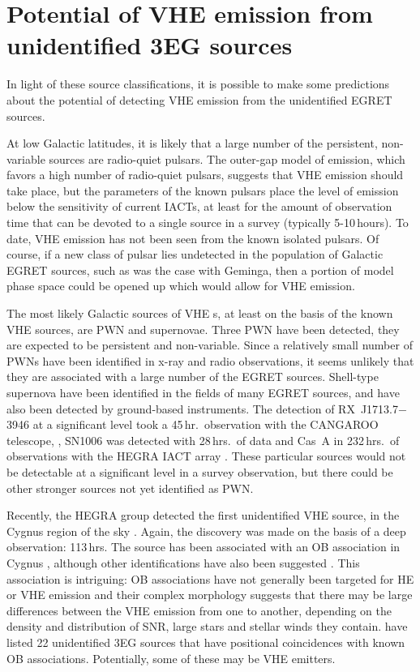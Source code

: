 \section{Potential of VHE emission from unidentified 3EG sources}
\label{SEC::SOURCES::VHE3EG}

In light of these source classifications, it is possible to make some
predictions about the potential of detecting VHE emission from the
unidentified EGRET sources.

At low Galactic latitudes, it is likely that a large number of the
persistent, non-variable sources are radio-quiet pulsars. The
outer-gap model of emission, which favors a high number of radio-quiet
pulsars, suggests that VHE \Gray emission should take place, but the
parameters of the known pulsars place the level of emission below the
sensitivity of current IACTs, at least for the amount of observation
time that can be devoted to a single source in a survey (typically
5-10\,hours). To date, VHE emission has not been seen from the known
isolated pulsars. Of course, if a new class of pulsar lies undetected
in the population of Galactic EGRET sources, such as was the case with
Geminga, then a portion of model phase space could be opened up which
would allow for VHE emission.

The most likely Galactic sources of VHE {\Grayc}s, at least on the
basis of the known VHE sources, are PWN and supernovae. Three PWN have
been detected, they are expected to be persistent and
non-variable. Since a relatively small number of PWNs have been
identified in x-ray and radio observations, it seems unlikely that
they are associated with a large number of the EGRET
sources. Shell-type supernova have been identified in the fields of
many EGRET sources, and have also been detected by ground-based
instruments. The detection of RX~J1713.7$-$3946 at a significant level
took a 45\,hr.\ observation with the CANGAROO telescope,
\citep{REF::MURAISHI::AA2000}, SN1006 was detected with 28\,hrs.\ of
data \citep{REF::TANIMORI::APJ1998} and Cas~A in 232\,hrs.\ of
observations with the HEGRA IACT array
\citep{REF::AHARONIAN::AA2001}. These particular sources would not be
detectable at a significant level in a survey observation, but there
could be other stronger sources not yet identified as PWN.

Recently, the HEGRA group detected the first unidentified VHE source,
in the Cygnus region of the sky \citep{REF::AHARONIAN::AA2002::UNID}.
Again, the discovery was made on the basis of a deep observation:
113\,hrs. The source has been associated with an OB association in
Cygnus \citep{REF::BUTT::APJ2003}, although other identifications have
also been suggested \citep{REF::MUKHERJEE::APJ2003}. This association
is intriguing: OB associations have not generally been targeted for
HE or VHE emission and their complex morphology suggests that there may be
large differences between the VHE emission from one to another,
depending on the density and distribution of SNR, large stars and
stellar winds they contain. \citet{REF::ROMERO::AA1999} have listed 22
unidentified 3EG sources that have positional coincidences with known
OB associations. Potentially, some of these may be VHE \Gray emitters.

